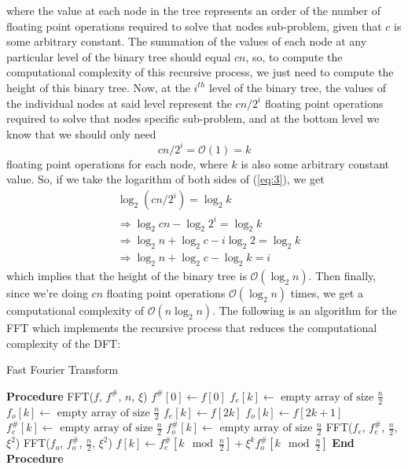 \documentclass[11pt]{article}
\begin{document}
where the value at each node in the tree represents an order of the number of floating point operations
required to solve that nodes sub-problem, given that $c$ is some arbitrary constant.
The summation of the values of each node at any particular level of the binary tree should equal $cn$,
so, to compute the computational complexity of this recursive process, we just need to compute the height of this
binary tree.
Now, at the $i^{th}$ level of the binary tree, the values of the
individual nodes at said level represent the $cn/2^i$ floating point operations required to solve that nodes specific
sub-problem,
and at the bottom level we know that we should
only need 
\begin{equation}
	cn/2^i = \mathcal{O}(1) = k
	\label{eq:3}
\end{equation}
floating point operations for each node, where $k$ is also some arbitrary constant value.
So, if
we take the logarithm of both sides of (\ref{eq:3}), we get
\begin{equation*}
	\begin{aligned}
		&\log_2{(cn/2^i)} = \log_2{k} \\
		&\Rightarrow\log_2{cn} - \log_2{2^i} = \log_2{k} \\
		&\Rightarrow\log_2{n} + \log_2{c} - i\log_2{2} = \log_2{k} \\
		&\Rightarrow\log_2{n} + \log_2{c} - \log_2{k} = i
	\end{aligned}
\end{equation*}
which implies that the height of the binary tree is $\mathcal{O}(\log_2{n})$.
Then finally, since we're doing $cn$ floating point operations $\mathcal{O}(\log_2{n})$ times,
we get a computational complexity of $\mathcal{O}(n\log_2{n})$.
The following is an algorithm for the FFT which implements the recursive process that reduces the
computational complexity of the DFT:
\begin{algorithm}
\caption{Fast Fourier Transform}
\begin{algorithmic}[1]
	\STATE \textbf{Procedure} \textsc{FFT}($f$, $f^{\#}$, $n$, $\xi$)
	    \STATE $f^{\#}[0] \gets f[0]$
	\ELSE
		\STATE $f_e[k] \gets \text{ empty array of size } \frac{n}{2}$
		\STATE $f_o[k] \gets \text{ empty array of size } \frac{n}{2}$
			\STATE $f_e[k] \gets f[2k]$
			\STATE $f_o[k] \gets f[2k+1]$
		\ENDFOR
		\STATE $f_e^{\#}[k] \gets \text{ empty array of size } \frac{n}{2}$
		\STATE $f_o^{\#}[k] \gets \text{ empty array of size } \frac{n}{2}$
		\STATE \textsc{FFT}($f_e$, $f_e^{\#}$, $\frac{n}{2}$, $\xi^2$)
		\STATE \textsc{FFT}($f_o$, $f_o^{\#}$, $\frac{n}{2}$, $\xi^2$)
			\STATE $f[k] \gets f_e^{\#}[k \mod{\frac{n}{2}}] + \xi^k f_o^{\#}[k \mod{\frac{n}{2}}]$
		\ENDFOR
        \ENDIF
    \STATE \textbf{End Procedure}
\end{algorithmic}
\end{algorithm}
\newpage
\end{document}

